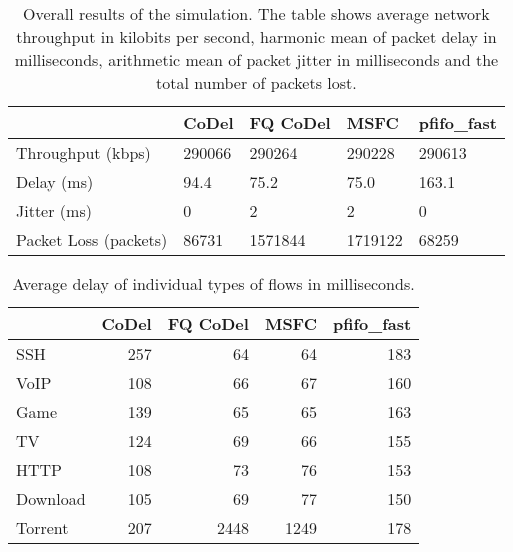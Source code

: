 \begin{table}[]
	\centering
	\begin{tabular}{@{}lllll@{}}
		\toprule
								& CoDel & FQ CoDel & MSFC & pfifo\_fast  \\ \midrule
		Throughput (kbps)       & 290066    & 290264 & 290228   & 290613 \\
		Delay (ms)              & 94.4      & 75.2   & 75.0     & 163.1    \\
		Jitter (ms)             & 0         & 2      & 2        & 0      \\
		Packet Loss (packets)   & 86731     & 1571844& 1719122  & 68259  \\ \bottomrule
	\end{tabular}
	\caption{Overall results of the simulation. The table shows average network throughput in kilobits per second, harmonic mean of packet delay in milliseconds, arithmetic mean of packet jitter in milliseconds and the total number of packets lost.}
	\label{tab:results_A}
\end{table}


\begin{table}
	\centering
	
	\begin{tabular}{@{}l|rrrr@{}}
		\toprule
		         & CoDel & FQ CoDel & MSFC & pfifo\_fast \\ \midrule
		SSH      &   257 &       64 &   64 &         183 \\
		VoIP     &   108 &       66 &   67 &         160 \\
		Game     &   139 &       65 &   65 &         163 \\
		TV       &   124 &       69 &   66 &         155 \\
		HTTP     &   108 &       73 &   76 &         153 \\
		Download &   105 &       69 &   77 &         150 \\
		Torrent  &   207 &     2448 & 1249 &         178 \\ \bottomrule
	\end{tabular}
	\caption{Average delay of individual types of flows in milliseconds.}
	\label{tab:delay_A}
\end{table}


